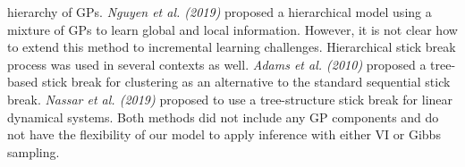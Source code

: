 \documentclass[preprint,11pt]{elsarticle}
\begin{document}
    hierarchy of GPs. \textit{Nguyen et al. (2019)}\cite{nguyen2019scalable} proposed a hierarchical
    model using a mixture of GPs to learn global and
    local information. However, it is not clear how to extend
    this method to incremental learning challenges.
    Hierarchical stick break process was used in several contexts
    as well. \textit{Adams et al. (2010)}\cite{adams2010treestructured} proposed a tree-based
    stick break for clustering as an alternative to the standard
    sequential stick break. \textit{Nassar et al. (2019)}\cite{nassar2019tree} proposed to use
    a tree-structure stick break for linear dynamical systems.
    Both methods did not include any GP components and do
    not have the flexibility of our model to apply inference with
    either VI or Gibbs sampling.
    \begin{table}
    \centering
    \caption{Test accuracy on CUB-200-2011. Average over 10 runs $\pm$( SEM). In bold: statistically significant best results (p=0.05).}
    \label{tab:table1}
    \end{table}
    
\end{document}
